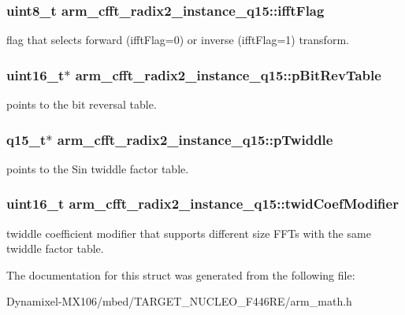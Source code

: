 \subsubsection[{\texorpdfstring{ifft\+Flag}{ifftFlag}}]{\setlength{\rightskip}{0pt plus 5cm}uint8\+\_\+t arm\+\_\+cfft\+\_\+radix2\+\_\+instance\+\_\+q15\+::ifft\+Flag}\hypertarget{structarm__cfft__radix2__instance__q15_ab5c073286bdd2f6e2bf783ced36bf1de}{}\label{structarm__cfft__radix2__instance__q15_ab5c073286bdd2f6e2bf783ced36bf1de}
flag that selects forward (ifft\+Flag=0) or inverse (ifft\+Flag=1) transform. 
\subsubsection[{\texorpdfstring{p\+Bit\+Rev\+Table}{pBitRevTable}}]{\setlength{\rightskip}{0pt plus 5cm}uint16\+\_\+t$\ast$ arm\+\_\+cfft\+\_\+radix2\+\_\+instance\+\_\+q15\+::p\+Bit\+Rev\+Table}\hypertarget{structarm__cfft__radix2__instance__q15_ab88afeff6493be3c8b5e4530efa82d51}{}\label{structarm__cfft__radix2__instance__q15_ab88afeff6493be3c8b5e4530efa82d51}
points to the bit reversal table. 
\subsubsection[{\texorpdfstring{p\+Twiddle}{pTwiddle}}]{\setlength{\rightskip}{0pt plus 5cm}q15\+\_\+t$\ast$ arm\+\_\+cfft\+\_\+radix2\+\_\+instance\+\_\+q15\+::p\+Twiddle}\hypertarget{structarm__cfft__radix2__instance__q15_a3809dd15e7cbf1a054c728cfbbb0cc5a}{}\label{structarm__cfft__radix2__instance__q15_a3809dd15e7cbf1a054c728cfbbb0cc5a}
points to the Sin twiddle factor table. 
\subsubsection[{\texorpdfstring{twid\+Coef\+Modifier}{twidCoefModifier}}]{\setlength{\rightskip}{0pt plus 5cm}uint16\+\_\+t arm\+\_\+cfft\+\_\+radix2\+\_\+instance\+\_\+q15\+::twid\+Coef\+Modifier}\hypertarget{structarm__cfft__radix2__instance__q15_a6f2ab87fb4c568656e1f92f687b5c850}{}\label{structarm__cfft__radix2__instance__q15_a6f2ab87fb4c568656e1f92f687b5c850}
twiddle coefficient modifier that supports different size F\+F\+Ts with the same twiddle factor table. 

The documentation for this struct was generated from the following file\+:\begin{DoxyCompactItemize}
\item 
Dynamixel-\/\+M\+X106/mbed/\+T\+A\+R\+G\+E\+T\+\_\+\+N\+U\+C\+L\+E\+O\+\_\+\+F446\+R\+E/arm\+\_\+math.\+h\end{DoxyCompactItemize}
